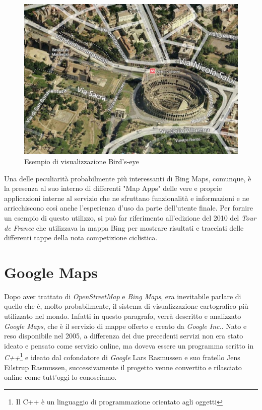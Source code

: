 \begin{figure}[H]
	\centering
	\includegraphics[scale=0.5]{figure/BINGBirdseye.eps}
	\caption{Esempio di visualizzazione Bird's-eye}
\end{figure}

Una delle peculiarità probabilmente più interessanti di Bing Maps, comunque, è la presenza al suo interno di differenti "Map Apps" delle vere e proprie applicazioni interne al servizio che ne sfruttano funzionalità e informazioni e ne arricchiscono così anche l'esperienza d'uso da parte dell'utente finale. Per fornire un esempio di questo utilizzo, si può far riferimento all'edizione del 2010 del \textit{Tour de France} che utilizzava la mappa Bing per mostrare risultati e tracciati delle differenti tappe della nota competizione ciclistica.\cite{bing:tdf}

\section{Google Maps}

Dopo aver trattato di \textit{OpenStreetMap} e \textit{Bing Maps}, era inevitabile parlare di quello che è, molto probabilmente, il sistema di visualizzazione cartografico più utilizzato nel mondo. Infatti in questo paragrafo, verrà descritto e analizzato \textit{Google Maps}, che è il servizio di mappe offerto e creato da \textit{Google Inc.}. Nato e reso disponibile nel 2005, a differenza dei due precedenti servizi non era stato ideato e pensato come servizio online, ma doveva essere un programma scritto in \textit{C++}\footnote{Il C++ è un linguaggio di programmazione orientato agli oggetti\cite{wiki:cpp}} e ideato dal cofondatore di \textit{Google} Lars Rasmussen e suo fratello Jens Eilstrup Rasmussen, successivamente il progetto venne convertito e rilasciato online come tutt'oggi lo conosciamo.

